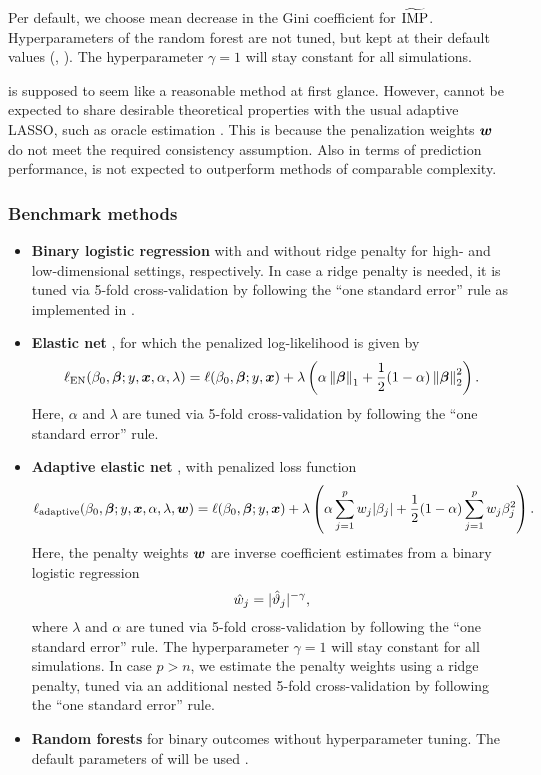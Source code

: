 Per default, we choose mean decrease in the Gini coefficient for $\widetilde{\operatorname{IMP}}$.
Hyperparameters of the random forest are not tuned, but kept at their default
values (\eg {}, ). The hyperparameter $\gamma = 1$ will stay
constant for all simulations.

\ainet{} is supposed to seem like a reasonable method at first glance. However,
\ainet{} cannot be expected to share desirable theoretical properties with the
usual adaptive LASSO, such as oracle estimation \citep{Zou2006}. This is because
the penalization weights $\text{\boldmath$w$}$ do not meet the required consistency assumption.
Also in terms of prediction performance, \ainet{} is not expected to outperform
methods of comparable complexity.

\subsubsection{Benchmark methods}

\begin{itemize}
   \item \textbf{Binary logistic regression} \citep{mccullagh2019generalized}
   with and without ridge penalty for high- and
   low-dimensional settings, respectively. In case a ridge penalty is needed,
   it is tuned via 5-fold cross-validation by following the ``one standard
   error'' rule as implemented in  \citep{Friedman2010}.
   \item \textbf{Elastic net} \citep{Zou2005}, for which the penalized
   log-likelihood is given by
    $$\ell_{\text{EN}}(\beta_0, \text{\boldmath$\beta$}; y, \text{\boldmath$x$}, \alpha, \lambda) =
      \ell(\beta_0, \text{\boldmath$\beta$}; y, \text{\boldmath$x$}) + \lambda\left(\alpha \left\lVert\text{\boldmath$\beta$}\right\rVert_1 + \frac{1}{2} (1-\alpha) \left\lVert\text{\boldmath$\beta$}\right\rVert_2^2 \right).$$
    Here, $\alpha$ and $\lambda$ are tuned via 5-fold cross-validation by following
    the ``one standard error'' rule.
   \item \textbf{Adaptive elastic net} \citep{Zou2006}, with penalized loss function
    $$\ell_{\text{adaptive}}(\beta_0, \text{\boldmath$\beta$}; y, \text{\boldmath$x$}, \alpha, \lambda, \text{\boldmath$w$})
    = \ell(\beta_0, \text{\boldmath$\beta$}; y, \text{\boldmath$x$}) + \lambda\left(\alpha \sum_{j = 1}^p{w_j\lvert\beta_j\rvert} + \frac{1}{2} (1-\alpha) \sum_{j=1}^p{w_j\beta_j^2} \right).$$
    Here, the penalty weights $\text{\boldmath$w$}$ are inverse coefficient estimates from a
    binary logistic regression
    $$\hat{w}_j = \lvert\hat{\vartheta}_j\rvert^{-\gamma},$$
    where $\lambda$ and $\alpha$ are tuned via 5-fold cross-validation by
    following the ``one standard error'' rule.
    The hyperparameter $\gamma = 1$ will stay constant for all simulations.
    In case $p > n$, we estimate the penalty weights using a ridge penalty, tuned
    via an additional nested 5-fold cross-validation
    by following the ``one standard error'' rule.
    \item \textbf{Random forests} \citep{Breiman2001} for binary outcomes without
    hyperparameter tuning. The default parameters of  will be used
    \citep{ranger2017}. %
\end{itemize}


